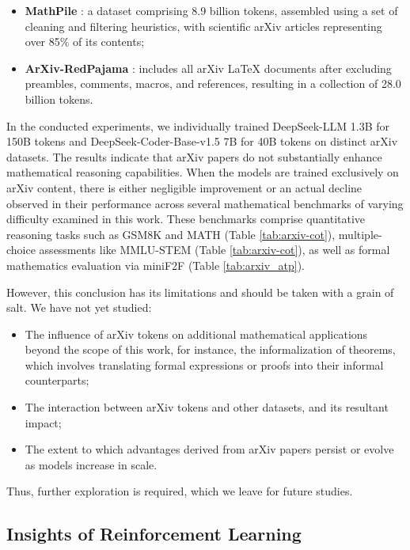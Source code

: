 \begin{itemize}[topsep=0pt]
\begin{itemize}[topsep=0pt]
    \item \textbf{MathPile} \citep{mathpile}: a dataset comprising 8.9 billion tokens, assembled using a set of cleaning and filtering heuristics, with scientific arXiv articles representing over 85\% of its contents;
    \item \textbf{ArXiv-RedPajama} \citep{redpajama}: includes all arXiv LaTeX documents after excluding preambles, comments, macros, and references, resulting in a collection of 28.0 billion tokens.
\end{itemize}

In the conducted experiments, we individually trained DeepSeek-LLM 1.3B for 150B tokens and DeepSeek-Coder-Base-v1.5 7B for 40B tokens on distinct arXiv datasets. The results indicate that arXiv papers do not substantially enhance mathematical reasoning capabilities. When the models are trained exclusively on arXiv content, there is either negligible improvement or an actual decline observed in their performance across several mathematical benchmarks of varying difficulty examined in this work. These benchmarks comprise quantitative reasoning tasks such as GSM8K and MATH (Table \ref{tab:arxiv-cot}), multiple-choice assessments like MMLU-STEM (Table \ref{tab:arxiv-cot}), as well as formal mathematics evaluation via miniF2F (Table \ref{tab:arxiv_atp}).

However, this conclusion has its limitations and should be taken with a grain of salt. We have not yet studied:

\begin{itemize}[topsep=0pt]
    \item The influence of arXiv tokens on additional mathematical applications beyond the scope of this work, for instance, the informalization of theorems, which involves translating formal expressions or proofs into their informal counterparts;
    \item The interaction between arXiv tokens and other datasets, and its resultant impact;
    \item The extent to which advantages derived from arXiv papers persist or evolve as models increase in scale.
\end{itemize}

Thus, further exploration is required, which we leave for future studies.

\subsection{Insights of Reinforcement Learning}

\end{itemize}
